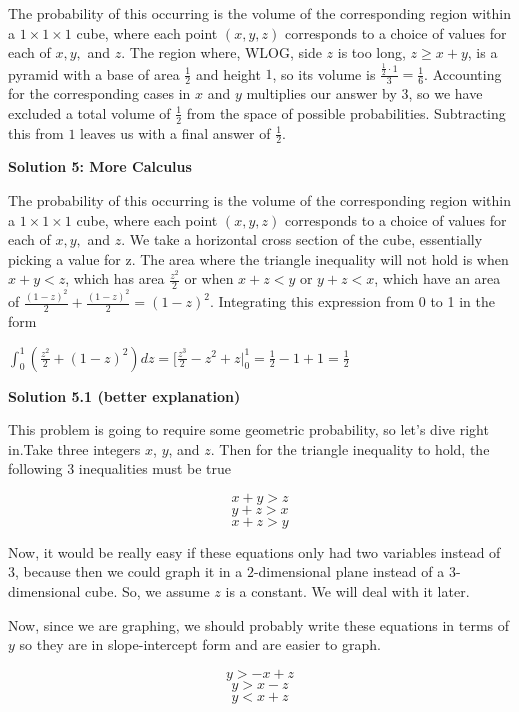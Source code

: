 \begin{enumerate}
The probability of this occurring is the volume of the corresponding region within a $1 \times 1 \times 1$ cube, where each point $(x,y,z)$ corresponds to a choice of values for each of $x, y,$ and $z$. The region where, WLOG, side $z$ is too long, $z\geq x+y$, is a pyramid with a base of area $\frac{1}{2}$ and height $1$, so its volume is $\frac{\frac{1}{2}\cdot 1}{3}=\frac{1}{6}$. Accounting for the corresponding cases in $x$ and $y$ multiplies our answer by $3$, so we have excluded a total volume of $\frac{1}{2}$ from the space of possible probabilities. Subtracting this from $1$ leaves us with a final answer of $\frac{1}{2}$.

 



\textbf{Solution 5: More Calculus}

The probability of this occurring is the volume of the corresponding region within a $1 \times 1 \times 1$ cube, where each point $(x,y,z)$ corresponds to a choice of values for each of $x, y,$ and $z$.  We take a horizontal cross section of the cube, essentially picking a value for z.  The area where the triangle inequality will not hold is when $x + y < z$, which has area $\frac{z^2}{2}$ or when $x+z<y$ or $y+z<x$, which have an area of $\frac{(1-z)^2}{2}+\frac{(1-z)^2}{2} = (1-z)^2.$ Integrating this expression from 0 to 1 in the form

 $\int_0^1 \left(\frac{z^2}{2} + (1-z)^2\right) dz = \bigg[\frac{z^3}{2} - z^2 + z \biggr |_0^1 = \frac{1}{2} -1 + 1 = \frac{1}{2}$




\textbf{Solution 5.1 (better explanation)}

This problem is going to require some geometric probability, so let's dive right in.Take three integers $x$, $y$, and $z$. Then for the triangle inequality to hold, the following $3$ inequalities must be true

 
 \[x + y > z\]
 \[y + z > x\]
 \[x + z > y\]

 Now, it would be really easy if these equations only had two variables instead of $3$, because then we could graph it in a $2$-dimensional plane instead of a $3$-dimensional cube. So, we assume $z$ is a constant. We will deal with it later.

 Now, since we are graphing, we should probably write these equations in terms of $y$ so they are in slope-intercept form and are easier to graph.

 
 \[y > -x + z\]
 \[y > x - z\]
 \[y < x + z\]


\end{enumerate}
